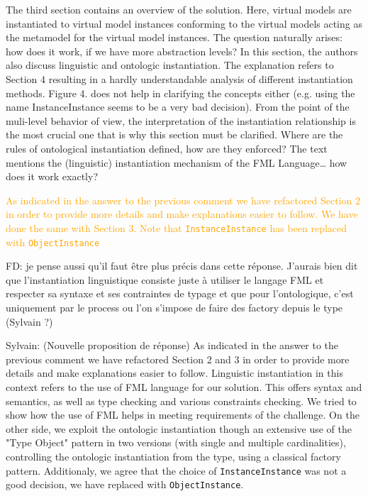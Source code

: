 \documentclass[10pt]{article}
\begin{document}
\begin{response}{The third section contains an overview of the solution. Here, virtual models are instantiated to virtual model instances conforming to the virtual models acting as the metamodel for the virtual model instances. The question naturally arises: how does it work, if we have more abstraction levels?  In this section, the authors also discuss linguistic and ontologic instantiation. The explanation refers to Section 4 resulting in a hardly understandable analysis of different instantiation methods. Figure 4. does not help in clarifying the concepts either (e.g. using the name InstanceInstance seems to be a very bad decision). From the point of the muli-level behavior of view, the interpretation of the instantiation relationship is the most crucial one that is why this section must be clarified. Where are the rules of ontological instantiation defined, how are they enforced? The text mentions the (linguistic) instantiation mechanism of the FML Language… how does it work exactly?}

\textcolor{orange}{As indicated in the answer to the previous comment we have refactored Section 2 in order to provide more details and make explanations easier to follow. We have done the same with Section 3. Note that \texttt{InstanceInstance} has been replaced with \texttt{ObjectInstance}} 

{\color{red} FD: je pense aussi qu'il faut être plus précis dans cette réponse. J'aurais bien dit que l'instantiation linguistique consiste juste à utiliser le langage FML et respecter sa syntaxe et ses contraintes de typage et que pour l'ontologique, c'est uniquement par le process ou l'on s'impose de faire des factory depuis le type (Sylvain ?)}

{\color{red} Sylvain: (Nouvelle proposition de réponse) As indicated in the answer to the previous comment we have refactored Section 2 and 3 in order to provide more details and make explanations easier to follow. Linguistic instantiation in this context refers to the use of FML language for our solution. This offers syntax and semantics, as well as type checking and various constraints checking. We tried to show how the use of FML helps in meeting requirements of the challenge. On the other side, we exploit the ontologic instantiation though an extensive use of the "Type Object" pattern in two versions (with single and multiple cardinalities), controlling the ontologic instantiation from the type, using a classical factory pattern. Additionaly, we agree that the choice of \texttt{InstanceInstance} was not a good decision, we have replaced with \texttt{ObjectInstance}.}

\end{response}
\end{document}
